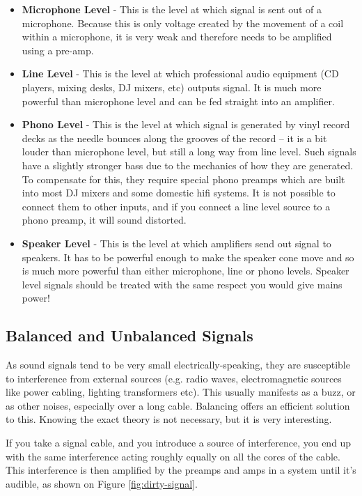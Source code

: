 \documentclass[14pt]{article} %
\begin{document}
\begin{itemize}

\item \textbf{Microphone Level} - This is the level at which signal is sent out of a microphone. Because this is only voltage created by the movement of a coil within a microphone, it is very weak and therefore needs to be amplified using a pre-amp.

\item \textbf{Line Level} - This is the level at which professional audio equipment (CD players, mixing desks, DJ mixers, etc) outputs signal. It is much more powerful than microphone level and can be fed straight into an amplifier.

\item \textbf{Phono Level} - This is the level at which signal is generated by vinyl record decks as the needle bounces along the grooves of the record – it is a bit louder than microphone level, but still a long way from line level. Such signals have a
slightly stronger bass due to the mechanics of how they are generated. To compensate for this, they require special phono preamps which are built into most DJ mixers and some domestic hifi systems. It is not possible to connect them to other inputs, and if you connect a line level source to a phono preamp, it will sound distorted.

\item \textbf{Speaker Level} - This is the level at which amplifiers send out signal to speakers. It has to be powerful enough to make the speaker cone move and so is much more powerful than either microphone, line or phono levels. Speaker level signals should be treated with the same respect you would give mains power!

\end{itemize}


\subsection{Balanced and Unbalanced Signals}
\label{balanced-unbalanced}
As sound signals tend to be very small electrically-speaking, they are susceptible to interference from external sources (e.g. radio waves, electromagnetic sources like power cabling, lighting transformers etc). This usually manifests as a buzz, or as other noises, especially over a long cable. Balancing offers an efficient solution to this. Knowing the exact theory is not necessary, but it is very interesting. 

If you take a signal cable, and you introduce a source of interference, you end up with the same interference acting roughly equally on all the cores of the cable. This interference is then amplified by the preamps and amps in a system until it’s audible, as shown on Figure \ref{fig:dirty-signal}.
\end{document}
